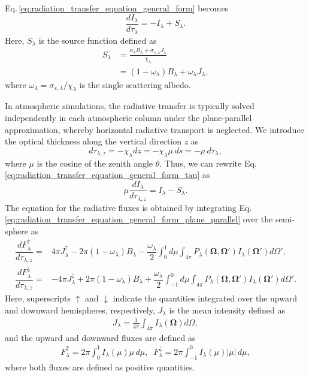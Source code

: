 Eq.\,\eqref{eq:radiation_transfer_equation_general_form} becomes
\begin{equation}
  \frac{dI_\lambda}{d\tau_\lambda} = - I_\lambda + S_\lambda.
\label{eq:radiation_transfer_equation_general_form_tau}
\end{equation}
Here, $S_\lambda$ is the source function defined as
\begin{align}
  S_\lambda &= \frac{\kappa_\lambda B_\lambda + \sigma_{s,\lambda} J_\lambda}{\chi_\lambda} \\
            &= (1-\omega_\lambda) B_\lambda + \omega_\lambda J_\lambda,
\end{align}
where $\omega_\lambda = \sigma_{s,\lambda}/\chi_\lambda$ is the single scattering albedo.


In atmospheric simulations, the radiative transfer is typically solved independently in each atmospheric column under the plane-parallel approximation, 
whereby horizontal radiative transport is neglected.
We introduce the optical thickness along the vertical direction $z$ as
\begin{equation}
  d\tau_{\lambda,z}= -\chi_\lambda dz= - \chi_\lambda \mu\, ds = -\mu\, d\tau_\lambda,
\end{equation}
where $\mu$ is the cosine of the zenith angle $\theta$. 
Thus, we can rewrite Eq.\,\eqref{eq:radiation_transfer_equation_general_form_tau} as
\begin{equation}
  \mu \frac{dI_\lambda}{d\tau_{\lambda,z}} = I_\lambda - S_\lambda. 
\label{eq:radiation_transfer_equation_general_form_plane_parallel}
\end{equation}
The equation for the radiative fluxes is obtained by integrating Eq.\,\eqref{eq:radiation_transfer_equation_general_form_plane_parallel} over the semi-sphere as
\begin{align}
 \dfrac{dF_\lambda^\uparrow}{d\tau_{\lambda,z}} =&  
   4\pi J_\lambda^\uparrow 
 - 2\pi (1-\omega_\lambda) B_\lambda
 - \dfrac{\omega_\lambda}{2}\int_0^1 d\mu \int_{4\pi} P_\lambda(\bm{\Omega},\bm{\Omega}') I_\lambda(\bm{\Omega}') d\Omega', \\
  \dfrac{dF_\lambda^\downarrow}{d\tau_{\lambda,z}} =& 
 - 4\pi J_\lambda^\downarrow 
 + 2\pi (1-\omega_\lambda) B_\lambda
 + \dfrac{\omega_\lambda}{2}\int_{-1}^0 d\mu \int_{4\pi} P_\lambda(\bm{\Omega},\bm{\Omega}') I_\lambda(\bm{\Omega}') d\Omega'. \label{eq:rte_general_form_plane_parallel_flux}
\end{align}
Here, superscripts $\uparrow$ and $\downarrow$ indicate the quantities integrated over the upward and downward hemispheres, respectively, 
$J_\lambda$ is the mean intensity defined as 
\begin{align}
  J_\lambda = \frac{1}{4\pi}\int_{4\pi} I_\lambda(\bm{\Omega}) d\Omega,
\end{align}
and the upward and downward fluxes are defined as
\begin{align}
F_\lambda^\uparrow =2\pi \int_0^1 I_\lambda(\mu)\mu\,d\mu,\;\;
F_\lambda^\downarrow =2\pi \int_{-1}^0 I_\lambda(\mu)|\mu|\,d\mu,
\end{align}
where both fluxes are defined as positive quantities.



